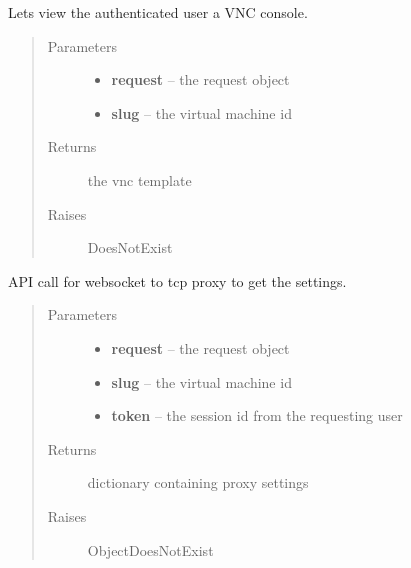 \documentclass[letterpaper,10pt,english]{sphinxmanual}
\begin{document}
\begin{fulllineitems}
\label{api/cloud:limeade.cloud.views.vnc.instance_vnc}
Lets view the authenticated user a VNC console.
\begin{quote}\begin{description}
\item[{Parameters}] \leavevmode\begin{itemize}
\item {} 
\textbf{request} -- the request object

\item {} 
\textbf{slug} -- the virtual machine id

\end{itemize}

\item[{Returns}] \leavevmode
the vnc template

\item[{Raises }] \leavevmode
DoesNotExist

\end{description}\end{quote}

\end{fulllineitems}


\begin{fulllineitems}
\label{api/cloud:limeade.cloud.views.vnc.instance_vnc_auth}
API call for websocket to tcp proxy to get the settings.
\begin{quote}\begin{description}
\item[{Parameters}] \leavevmode\begin{itemize}
\item {} 
\textbf{request} -- the request object

\item {} 
\textbf{slug} -- the virtual machine id

\item {} 
\textbf{token} -- the session id from the requesting user

\end{itemize}

\item[{Returns}] \leavevmode
dictionary containing proxy settings

\item[{Raises }] \leavevmode
ObjectDoesNotExist

\end{description}\end{quote}

\end{fulllineitems}
\end{document}
